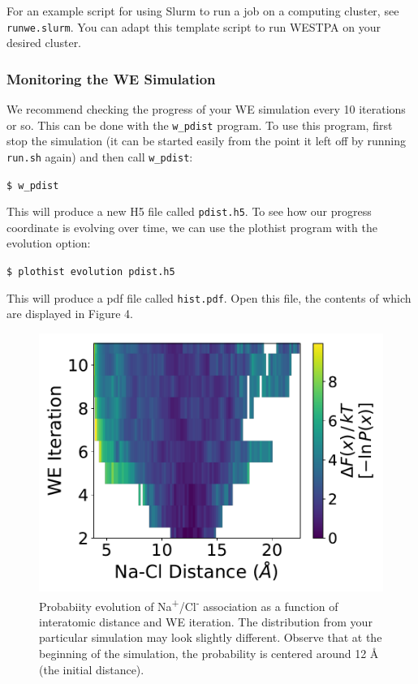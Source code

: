 \documentclass[9pt,tutorial,pubversion]{livecoms}
\begin{document}
For an example script for using Slurm to run a job on a computing cluster, see \verb|runwe.slurm|. 
You can adapt this template script to run WESTPA on your desired cluster.  

\subsubsection{Monitoring the WE Simulation}

We recommend checking the progress of your WE simulation every 10 iterations or so. 
This can be done with the \verb|w_pdist| program. To use this program, first stop the simulation (it can be started easily from the point it left off by running \verb|run.sh| again) and then call \verb|w_pdist|:
 
\verb|$ w_pdist|
 
This will produce a new H5 file called \verb|pdist.h5|. 
To see how our progress coordinate is evolving over time, we can use the plothist program with the evolution option:
 
\verb|$ plothist evolution pdist.h5|

This will produce a pdf file called \verb|hist.pdf|. 
Open this file, the contents of which are displayed in Figure 4. 

\begin{figure}
\includegraphics[width=\linewidth]{Figure4.pdf}
\caption{Probabiity evolution of Na\textsuperscript{+}/Cl\textsuperscript{-} association as a function of interatomic distance and WE iteration. 
The distribution from your particular simulation may look slightly different. 
Observe that at the beginning of the simulation, the probability is centered around 12 \AA{} (the initial distance).}
\label{fig:view}
\end{figure}
\end{document}
